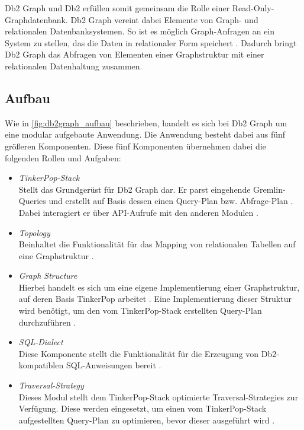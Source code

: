 Db2 Graph und Db2 erfüllen somit gemeinsam die Rolle einer Read-Only-Graph\-daten\-bank. Db2 Graph vereint dabei Elemente von Graph- und relationalen Datenbanksystemen. So ist es möglich Graph-Anfragen an ein System zu stellen, das die Daten in relationaler Form speichert \cite{vldb_tian, sigmod_tian}. Dadurch bringt Db2 Graph das Abfragen von Elementen einer Graphstruktur mit einer relationalen Datenhaltung zusammen. 

\subsection{Aufbau}
Wie in \autoref{fig:db2graph_aufbau} beschrieben, handelt es sich bei Db2 Graph um eine modular aufgebaute Anwendung. Die Anwendung besteht dabei aus fünf größeren Komponenten. Diese fünf Komponenten übernehmen dabei die folgenden Rollen und Aufgaben: 

\begin{itemize}
    \item \textit{TinkerPop-Stack}\\Stellt das Grundgerüst für Db2 Graph dar. Er parst eingehende Gremlin-Queries und erstellt auf Basis dessen einen Query-Plan bzw. Abfrage-Plan \cite{vldb_tian}. Dabei interagiert er über API-Aufrufe mit den anderen Modulen \cite{vldb_tian}.
    \item \textit{Topology}\\Beinhaltet die Funktionalität für das Mapping von relationalen Tabellen auf eine Graphstruktur \cite{vldb_tian, sigmod_tian}.
    \item \textit{Graph Structure}\\Hierbei handelt es sich um eine eigene Implementierung einer Graphstruktur, auf deren Basis TinkerPop arbeitet \cite{vldb_tian}. Eine Implementierung dieser Struktur wird benötigt, um den vom TinkerPop-Stack erstellten Query-Plan durchzuführen \cite{sigmod_tian}. 
    \item \textit{SQL-Dialect}\\Diese Komponente stellt die Funktionalität für die Erzeugung von Db2-kompatiblen SQL-Anweisungen bereit \cite{sigmod_tian}.
    \item \textit{Traversal-Strategy}\\Dieses Modul stellt dem TinkerPop-Stack optimierte Traversal-Strategies zur Verfügung. Diese werden eingesetzt, um einen vom TinkerPop-Stack aufgestellten Query-Plan zu optimieren, bevor dieser ausgeführt wird \cite{sigmod_tian}.  
\end{itemize}

